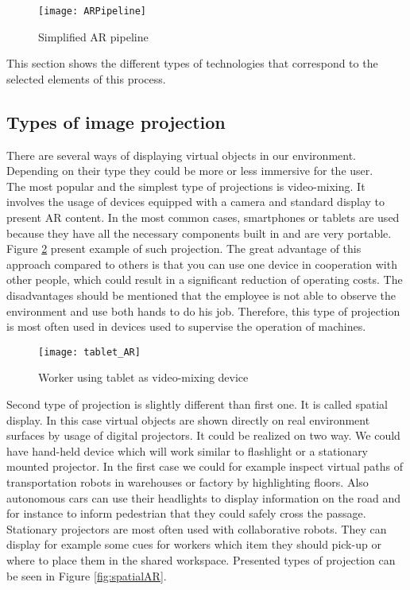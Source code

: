 \documentclass[printmode,en]{mgr}
\begin{document}
\begin{figure}[!ht]
  \centering
    \texttt{[image: ARPipeline]}
  \caption{Simplified AR pipeline \cite{Shipyard}}
  \label{fig:ARpipeline}
\end{figure}

This section shows the different types of technologies that correspond to the selected elements of this process.

\subsection{Types of image projection}
There are several ways of displaying virtual objects in our environment. Depending on their type they could be more or less immersive for the user.\\

The most popular and the simplest type of projections is video-mixing. It involves the usage of devices equipped with a camera and standard display to present AR content. In the most common cases, smartphones or tablets are used because they have all the necessary components built in and are very portable. Figure \ref{fig:tabletAR} present example of such projection. The great advantage of this approach compared to others is that you can use one device in cooperation with other people, which could result in a significant reduction of operating costs. The disadvantages should be mentioned that the employee is not able to observe the environment and use both hands to do his job. Therefore, this type of projection is most often used in devices used to supervise the operation of machines.

\begin{figure}[!ht]
  \centering
    \texttt{[image: tablet\_AR]}
  \caption{Worker using tablet as video-mixing device \cite{Shipyard}}
  \label{fig:tabletAR}
\end{figure}

Second type of projection is slightly different than first one. It is called spatial display. In this case virtual objects are shown directly on real environment surfaces by usage of digital projectors. It could be realized on two way. We could have hand-held device which will work similar to flashlight or a stationary mounted projector. In the first case we could for example inspect virtual paths of transportation robots in warehouses or factory by highlighting floors. Also autonomous cars can use their headlights to display information on the road and for instance to inform pedestrian that they could safely cross the passage. Stationary projectors are most often used with collaborative robots. They can display for example some cues for workers which item they should pick-up or where to place them in the shared workspace. Presented types of projection can be seen in Figure \ref{fig:spatialAR}.
\end{document}

